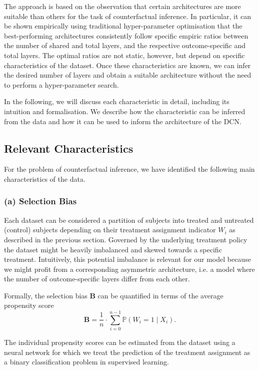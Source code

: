 The approach is based on the observation that certain architectures are more suitable than others for the task of counterfactual inference. In particular, it can be shown empirically using traditional hyper-parameter optimisation that the best-performing architectures consistently follow specific empiric ratios between the number of shared and total layers, and the respective outcome-specific and total layers. The optimal ratios are not static, however, but depend on specific characteristics of the dataset. Once these characteristics are known, we can infer the desired number of layers and obtain a suitable architecture without the need to perform a hyper-parameter search.

In the following, we will discuss each characteristic in detail, including its intuition and formalisation. We describe how the characteristic can be inferred from the data and how it can be used to inform the architecture of the DCN.


\subsection{Relevant Characteristics} \label{sec:relevant-characteristics}
For the problem of counterfactual inference, we have identified the following main characteristics of the data. 

\subsubsection{(a) Selection Bias}
Each dataset can be considered a partition  of subjects into treated and untreated (control) subjects depending on their treatment assignment indicator $W_i$ as described in the previous section. Governed by the underlying treatment policy the dataset might be heavily imbalanced and skewed towards a specific treatment. 
Intuitively, this potential imbalance is relevant for our model because we might profit from a corresponding asymmetric architecture, i.e. a model where the number of outcome-specific layers differ from each other. 

Formally, the selection bias $\mathbf{B}$ can be quantified in terms of the average propensity score 
$$
\mathbf{B} = \frac{1}{n} \cdot \sum \limits_{{i=0}}^{n-1}  \mathbb{P}(W_i = 1 \mid X_i).
$$

The individual propensity scores can be estimated from the dataset using a neural network for which we treat the prediction of the treatment assignment as a binary classification problem in supervised learning. 



